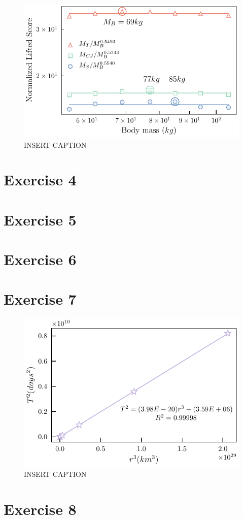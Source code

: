 \documentclass{article}
\begin{document}
\begin{figure}[h!]
  \includegraphics[width=\linewidth]{Q03/liftingPowerLawNormed.pdf}
  \caption{INSERT CAPTION}
  \label{fig:liftingPowerLawPlot}
\end{figure}

\section{Exercise 4}

\section{Exercise 5}

\section{Exercise 6}

\section{Exercise 7}

\begin{figure}[h!]
  \includegraphics[width=\linewidth]{Q07/keplerLawPlot.pdf}
  \caption{INSERT CAPTION}
  \label{fig:keplerLawPlot}
\end{figure}

\section{Exercise 8}
\end{document}
